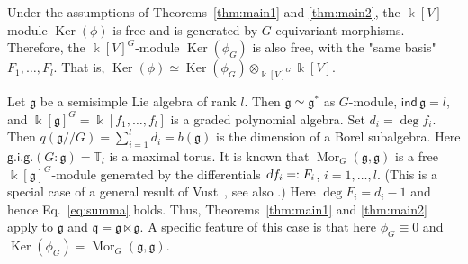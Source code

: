 \begin{cl}  Under the assumptions of Theorems~\ref{thm:main1} and \ref{thm:main2},
the ${\Bbbk}[V]$-module ${\operatorname{Ker}}(\phi)$ is free and is generated by $G$-equivariant morphisms.
Therefore, the ${\Bbbk}[V]^G$-module ${\operatorname{Ker}}(\phi_G)$ is also free, with the "same basis" $F_1,\dots,F_l$.
That is,  ${\operatorname{Ker}}(\phi)\simeq {\operatorname{Ker}}(\phi_G)\otimes_{{\Bbbk}[V]^G}{\Bbbk}[V]$.
\end{cl}
\begin{ex}   \label{ex:adjoint}
Let ${{\mathfrak g}}$ be a semisimple Lie algebra of rank $l$. Then ${{\mathfrak g}}\simeq {{\mathfrak g}}^*$ as $G$-module,
${{\mathsf{ind\,}}}{{\mathfrak g}}=l$, and ${\Bbbk}[{{\mathfrak g}}]^G={\Bbbk}[f_1,\dots,f_l]$ is a graded polynomial algebra. Set $d_i=\deg f_i$.
Then $q({{\mathfrak g}}{/\!\!/} G)=\sum_{i=1}^l d_i=b({{\mathfrak g}})$ is the dimension of a Borel subalgebra. Here
${\mathsf{g.i.g.}}(G:{{\mathfrak g}})={{\mathbb T}}_l$ is a maximal torus. It is known that ${\operatorname{Mor}}_G({{\mathfrak g}},{{\mathfrak g}})$ is a free 
${\Bbbk}[{{\mathfrak g}}]^G$-module generated by the differentials $\textsl{d}f_i=:F_i$, $i=1,\dots,l$. (This is a special case of a general result of Vust~\cite[Ch.\,III, \S\,2]{vust}, see also \cite[Theorem\,4.5]{p05}.) Here
$\deg F_i=d_i-1$ and hence Eq.~\eqref{eq:summa} holds. Thus,  
Theorems~\ref{thm:main1} and \ref{thm:main2} apply to ${{\mathfrak g}}$ and ${{\mathfrak q}}={{\mathfrak g}}\ltimes{{\mathfrak g}}$. A specific feature of 
this case is that here $\phi_G\equiv 0$ and ${\operatorname{Ker}}(\phi_G)={\operatorname{Mor}}_G({{\mathfrak g}},{{\mathfrak g}})$.
\end{ex}

